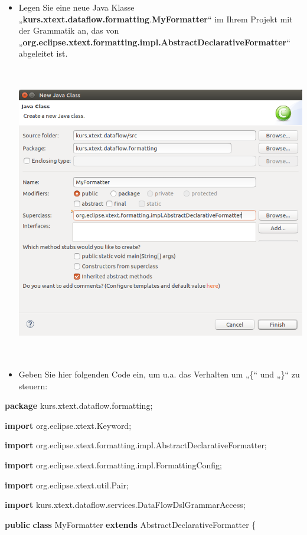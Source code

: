 \documentclass[a4]{article}
\begin{document}
\begin{itemize}
\item
  Legen Sie eine neue Java Klasse
  „\textbf{kurs.xtext.dataflow.formatting}.\textbf{MyFormatter}`` im
  Ihrem Projekt mit der Grammatik an, das von
  „\textbf{org.eclipse.xtext.formatting.impl.AbstractDeclarativeFormatter}``
  abgeleitet ist.

  \includegraphics[width=5.89650in,height=5.12010in]{./Pictures/10000201000002F00000028DA25B000046F4964A.png}
\item
  Geben Sie hier folgenden Code ein, um u.a. das Verhalten um „\{`` und
  „\}`` zu steuern:
\end{itemize}

\textbf{package} kurs.xtext.dataflow.formatting;

\textbf{import} org.eclipse.xtext.Keyword;

\textbf{import}
org.eclipse.xtext.formatting.impl.AbstractDeclarativeFormatter;

\textbf{import} org.eclipse.xtext.formatting.impl.FormattingConfig;

\textbf{import} org.eclipse.xtext.util.Pair;

\textbf{import} kurs.xtext.dataflow.services.DataFlowDslGrammarAccess;

\textbf{public} \textbf{class} MyFormatter \textbf{extends}
AbstractDeclarativeFormatter \{
\end{document}
